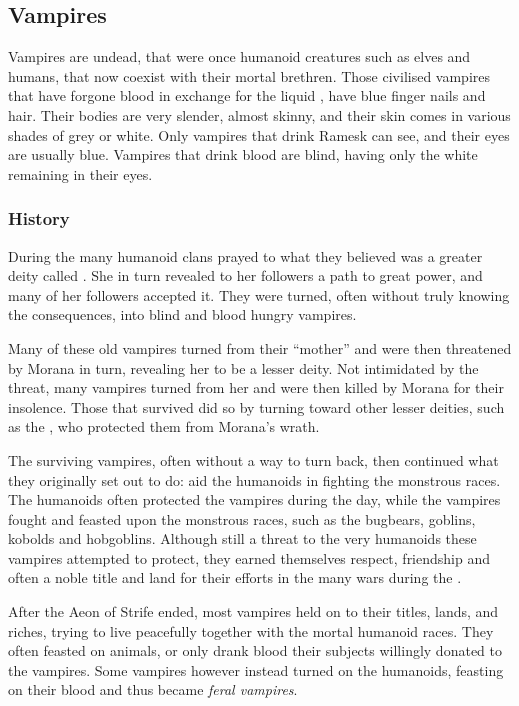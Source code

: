 \subsection{Vampires}
\label{sec:Vampires}

Vampires are undead, that were once humanoid creatures such as elves and
humans, that now coexist with their mortal brethren. Those civilised vampires
that have forgone blood in exchange for the liquid , have
blue finger nails and hair. Their bodies are very slender, almost skinny, and
their skin comes in various shades of grey or white. Only vampires that drink
Ramesk can see, and their eyes are usually blue. Vampires that drink blood are
blind, having only the white remaining in their eyes.

\subsubsection{History}

During the  many humanoid clans prayed to what
they believed was a greater deity called . She in turn
revealed to her followers a path to great power, and many of her followers
accepted it. They were turned, often without truly knowing the consequences,
into blind and blood hungry vampires.

Many of these old vampires turned from their ``mother'' and were then
threatened by Morana in turn, revealing her to be a lesser deity. Not
intimidated by the threat, many vampires turned from her and were then killed
by Morana for their insolence. Those that survived did so by turning toward
other lesser deities, such as the , who protected
them from Morana's wrath.

The surviving vampires, often without a way to turn back, then continued
what they originally set out to do: aid the humanoids in fighting the
monstrous races. The humanoids often protected the vampires during the day,
while the vampires fought and feasted upon the monstrous races, such as the
bugbears, goblins, kobolds and hobgoblins. Although still a threat to the very
humanoids these vampires attempted to protect, they earned themselves respect,
friendship and often a noble title and land for their efforts in the many wars
during the .

After the Aeon of Strife ended, most vampires held on to their titles, lands,
and riches, trying to live peacefully together with the mortal humanoid races.
They often feasted on animals, or only drank blood their subjects willingly
donated to the vampires. Some vampires however instead turned on the humanoids,
feasting on their blood and thus became \emph{feral vampires}.

